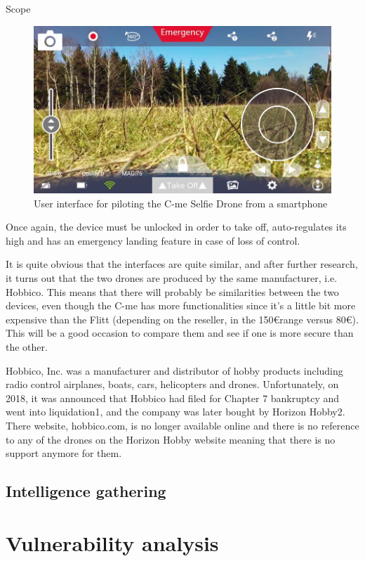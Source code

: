 \begin{chaptercover}{Scope}
\begin{figure}[H]
  \centering
  \includegraphics[width=0.7\linewidth]{figures/cme-selfie-drone-ui}
  \caption{User interface for piloting the C-me Selfie Drone from a smartphone}
  \label{fig:flitt-selfie-cam}
\end{figure}

Once again, the device must be unlocked in order to take off, auto-regulates its high and has an emergency landing feature in case of loss of control.

\begin{tip}
It is quite obvious that the interfaces are quite similar, and after further research, it turns out that the two drones are produced by the same manufacturer, i.e. Hobbico. This means that there will probably be similarities between the two devices, even though the C-me has more functionalities since it’s a little bit more expensive than the Flitt (depending on the reseller, in the 150\euro range versus 80\euro). This will be a good occasion to compare them and see if one is more secure than the other.

Hobbico, Inc. was a manufacturer and distributor of hobby products including radio control airplanes, boats, cars, helicopters and drones. Unfortunately, on 2018, it was announced that Hobbico had filed for Chapter 7 bankruptcy and went into liquidation1, and the company was later bought by Horizon Hobby2. There website, hobbico.com, is no longer available online and there is no reference to any of the drones on the Horizon Hobby website meaning that there is no support anymore for them.
\end{tip}

\subsection{Intelligence gathering}


\section{Vulnerability analysis}


\end{chaptercover}
